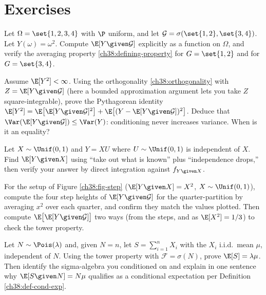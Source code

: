 \section{Exercises}
\label{ch38:exercises}

\begin{exercise}
\label{ch38:ex-def}
Let $\Omega = \set{1,2,3,4}$ with $\P$ uniform, and let $\mathcal{G} = \sigma(\set{1,2}, \set{3,4})$.
Let $Y(\omega) = \omega^2$. Compute $\E[Y\given\mathcal{G}]$ explicitly as a function on $\Omega$, and
verify the averaging property \eqref{ch38:defining-property} for $G = \set{1,2}$ and for $G =
\set{3,4}$.
\end{exercise}

\begin{exercise}
\label{ch38:ex-variance}
Assume $\E[Y^2] < \infty$. Using the orthogonality \eqref{ch38:orthogonality} with
$Z = \E[Y\given\mathcal{G}]$ (here a bounded approximation argument lets you take $Z$ square-integrable),
prove the
Pythagorean identity $\E[Y^2] = \E\big[\E[Y\given\mathcal{G}]^2\big] +
\E\big[(Y - \E[Y\given\mathcal{G}])^2\big]$. Deduce that $\Var(\E[Y\given\mathcal{G}]) \le \Var(Y)$:
conditioning never increases variance. When is it an equality?
\end{exercise}

\begin{exercise}
\label{ch38:ex-takeout}
Let $X \sim \Unif(0,1)$ and $Y = X U$ where $U \sim \Unif(0,1)$ is independent of $X$. Find
$\E[Y\given X]$ using ``take out what is known'' plus ``independence drops,'' then verify your answer
by direct integration against $f_{Y\given X}$.
\end{exercise}

\begin{exercise}
\label{ch38:ex-coarser}
For the setup of Figure \ref{ch38:fig-step} ($\E[Y\given X] = X^2$, $X \sim \Unif(0,1)$), compute the
four step heights of $\E[Y\given\mathcal{G}]$ for the quarter-partition by averaging $x^2$ over each
quarter, and confirm they match the values plotted. Then compute $\E\big[\E[Y\given\mathcal{G}]\big]$
two ways (from the steps, and as $\E[X^2] = 1/3$) to check the tower property.
\end{exercise}

\begin{exercise}
\label{ch38:ex-tower}
Let $N \sim \Pois(\lambda)$ and, given $N = n$, let $S = \sum_{i=1}^n X_i$ with the $X_i$ i.i.d.\
mean $\mu$, independent of $N$. Using the tower property with $\mathcal{F} = \sigma(N)$, prove
$\E[S] = \lambda\mu$. Then identify the sigma-algebra you conditioned on and explain in one sentence
why $\E[S\given N] = N\mu$ qualifies as a conditional expectation per Definition
\ref{ch38:def-cond-exp}.
\end{exercise}

